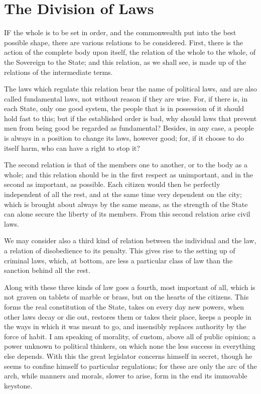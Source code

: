 \documentclass[12pt]{report}
\begin{document}
\section{The Division of Laws}
IF the whole is to be set in order, and the commonwealth put into the best possible shape, there are various relations to be considered. First, there is the action of the complete body upon itself, the relation of the whole to the whole, of the Sovereign to the State; and this relation, as we shall see, is made up of the relations of the intermediate terms.

The laws which regulate this relation bear the name of political laws, and are also called fundamental laws, not without reason if they are wise. For, if there is, in each State, only one good system, the people that is in possession of it should hold fast to this; but if the established order is bad, why should laws that prevent men from being good be regarded as fundamental? Besides, in any case, a people is always in a position to change its laws, however good; for, if it choose to do itself harm, who can have a right to stop it?

The second relation is that of the members one to another, or to the body as a whole; and this relation should be in the first respect as unimportant, and in the second as important, as possible. Each citizen would then be perfectly independent of all the rest, and at the same time very dependent on the city; which is brought about always by the same means, as the strength of the State can alone secure the liberty of its members. From this second relation arise civil laws.

We may consider also a third kind of relation between the individual and the law, a relation of disobedience to its penalty. This gives rise to the setting up of criminal laws, which, at bottom, are less a particular class of law than the sanction behind all the rest.

Along with these three kinds of law goes a fourth, most important of all, which is not graven on tablets of marble or brass, but on the hearts of the citizens. This forms the real constitution of the State, takes on every day new powers, when other laws decay or die out, restores them or takes their place, keeps a people in the ways in which it was meant to go, and insensibly replaces authority by the force of habit. I am speaking of morality, of custom, above all of public opinion; a power unknown to political thinkers, on which none the less success in everything else depends. With this the great legislator concerns himself in secret, though he seems to confine himself to particular regulations; for these are only the arc of the arch, while manners and morals, slower to arise, form in the end its immovable keystone.
\end{document}
